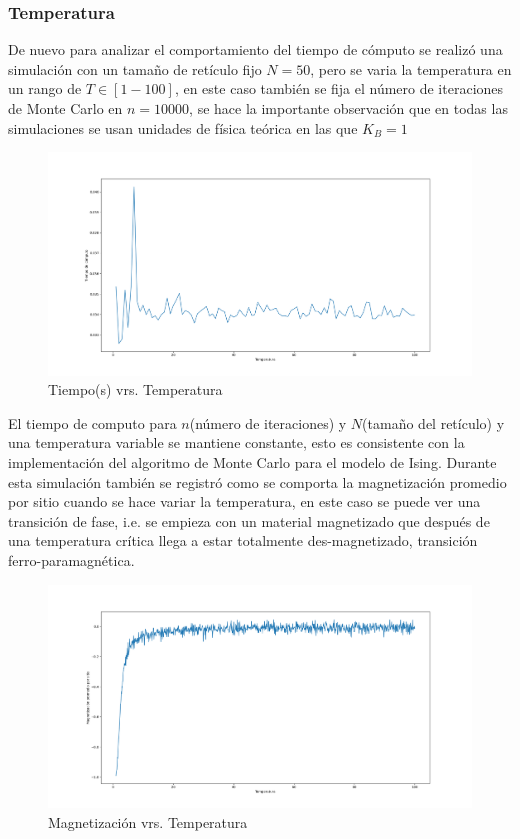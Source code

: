 \documentclass[a4paper]{article}
\begin{document}
\subsubsection{Temperatura}
De nuevo para analizar el comportamiento del tiempo de cómputo se realizó una simulación con un tamaño de retículo fijo $N=50$, pero se varia la temperatura en un rango de $T\in[1-100]$, en este caso también se fija el número de iteraciones de Monte Carlo en $n=10000$, se hace la importante observación que en todas las simulaciones se usan unidades de física teórica en las que $K_B=1$
\begin{figure}[H]
\begin{center}
\includegraphics[scale=0.3]{time_vrs_T.png} 
\end{center} 
\caption{Tiempo(s) vrs. Temperatura}
\end{figure}
El tiempo de computo para $n$(número de iteraciones) y $N$(tamaño del retículo) y una temperatura variable se mantiene constante, esto es consistente con la implementación del algoritmo de Monte Carlo para el modelo de Ising.
Durante esta simulación también se registró como se comporta la magnetización promedio por sitio cuando se hace variar la temperatura, en este caso se puede ver una transición de fase, i.e. se empieza con un material magnetizado que después de una temperatura crítica llega a estar totalmente des-magnetizado, transición ferro-paramagnética.
\begin{figure}[H]
\begin{center}
\includegraphics[scale=0.3]{M_vrs_T.png} 
\end{center} 
\caption{Magnetización vrs. Temperatura}
\end{figure}
\end{document}

